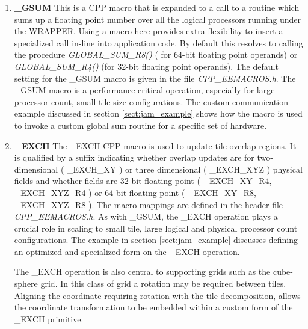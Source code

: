 \begin{enumerate}
\item {\bf \_GSUM}
This is a CPP macro that is expanded to a call to a routine
which sums up a floating point number
over all the logical processors running under the
WRAPPER. Using a macro here provides extra flexibility to insert
a specialized call in-line into application code. By default this
resolves to calling the procedure {\em GLOBAL\_SUM\_R8()} ( for
64-bit floating point operands)
or {\em GLOBAL\_SUM\_R4()} (for 32-bit floating point operands). The default
setting for the \_GSUM macro is given in the file {\em CPP\_EEMACROS.h}.
The \_GSUM macro is a performance critical operation, especially for
large processor count, small tile size configurations.
The custom communication example discussed in section \ref{sect:jam_example}
shows how the macro is used to invoke a custom global sum routine
for a specific set of hardware.

\item {\bf \_EXCH}
The \_EXCH CPP macro is used to update tile overlap regions.
It is qualified by a suffix indicating whether overlap updates are for
two-dimensional ( \_EXCH\_XY ) or three dimensional ( \_EXCH\_XYZ )
physical fields and whether fields are 32-bit floating point
( \_EXCH\_XY\_R4, \_EXCH\_XYZ\_R4 ) or 64-bit floating point
( \_EXCH\_XY\_R8, \_EXCH\_XYZ\_R8 ). The macro mappings are defined
in the header file {\em CPP\_EEMACROS.h}. As with \_GSUM, the 
\_EXCH operation plays a crucial role in scaling to small tile,
large logical and physical processor count configurations.
The example in section \ref{sect:jam_example} discusses defining an
optimized and specialized form on the \_EXCH operation.

The \_EXCH operation is also central to supporting grids such as
the cube-sphere grid. In this class of grid a rotation may be required
between tiles. Aligning the coordinate requiring rotation with the
tile decomposition, allows the coordinate transformation to 
be embedded within a custom form of the \_EXCH primitive.


\end{enumerate}
